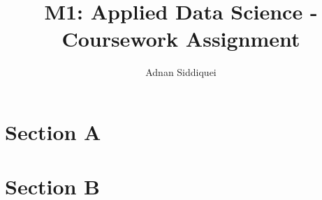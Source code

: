 \documentclass[a4paper,11pt]{article}
\title{\boldmath M1: Applied Data Science - Coursework Assignment}
\author{Adnan Siddiquei}
\affiliation{University of Cambridge}
\newcommand{\inlinecode}[1]{\lstinline{#1}}
\begin{document}
\maketitle
\flushbottom


\section{Section A}\label{sec:section-a}




\section{Section B}\label{sec:section-b}



\begin{thebibliography}{99}


\end{thebibliography}
\end{document}
